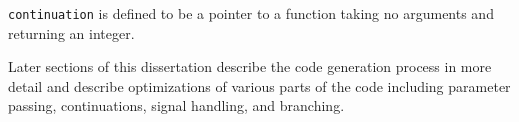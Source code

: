 \noindent
\texttt{continuation} is defined to be a pointer to a function taking
no arguments and returning an integer.

Later sections of this dissertation describe the code generation
process in more detail and describe optimizations of various parts of
the code including parameter passing, continuations, signal handling,
and branching.


\bigskip

\clearpage
\bigskip
